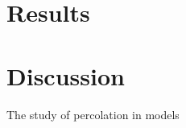 \documentclass{article}
\begin{document}
\begin{figure}
  
\end{figure}

\section{Results}


\section{Discussion}

The study of percolation in models
\end{document}
